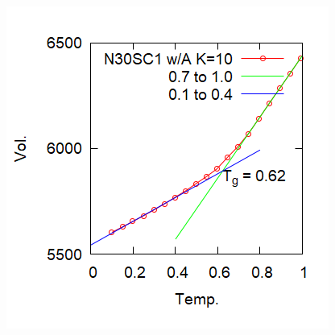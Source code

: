 \documentclass[unicode,12pt]{beamer}%
\begin{document}
\begin{frame}
\begin{columns}[t, onlytextwidth]
\begin{center}
			\includegraphics[width=.8\textwidth]{N30_SC1_WA_K10.png}
		\end{center}
	\end{columns}
\end{frame}
\end{document}
